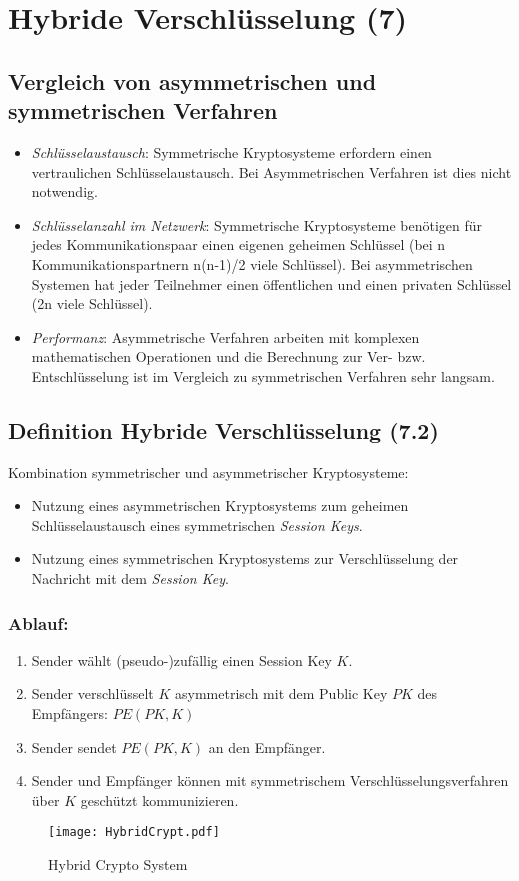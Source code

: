 \chapter{Hybride Verschlüsselung (7)}
\section{Vergleich von asymmetrischen und symmetrischen Verfahren}
\begin{itemize}
  \item \emph{Schlüsselaustausch}: Symmetrische Kryptosysteme erfordern einen vertraulichen Schlüsselaustausch. Bei Asymmetrischen Verfahren ist dies nicht notwendig.
  \item \emph{Schlüsselanzahl im Netzwerk}: Symmetrische Kryptosysteme benötigen für jedes Kommunikationspaar einen eigenen geheimen Schlüssel (bei n Kommunikationspartnern n(n-1)/2 viele Schlüssel). Bei asymmetrischen Systemen hat jeder Teilnehmer einen öffentlichen und einen privaten Schlüssel (2n viele Schlüssel).
  \item \emph{Performanz}: Asymmetrische Verfahren arbeiten mit komplexen mathematischen Operationen und die Berechnung zur Ver- bzw. Entschlüsselung ist im Vergleich zu symmetrischen Verfahren sehr langsam.
\end{itemize}

\section{Definition Hybride Verschlüsselung (7.2)}
Kombination symmetrischer und asymmetrischer Kryptosysteme:
\begin{itemize}
  \item Nutzung eines asymmetrischen Kryptosystems zum geheimen Schlüsselaustausch eines symmetrischen \emph{Session Keys}.
  \item Nutzung eines symmetrischen Kryptosystems zur Verschlüsselung der Nachricht mit dem \emph{Session Key}.
\end{itemize}
\subsection*{Ablauf:}
\begin{enumerate}
  \item Sender wählt (pseudo-)zufällig einen Session Key $K$.
  \item Sender verschlüsselt $K$ asymmetrisch mit dem Public Key $PK$ des Empfängers: $PE(PK, K)$
  \item Sender sendet $PE(PK, K)$ an den Empfänger.
  \item Sender und Empfänger können mit symmetrischem Verschlüsselungsverfahren über $K$ geschützt kommunizieren. 
\end{enumerate}
\begin{figure}[htp]
	\centering
	\texttt{[image: HybridCrypt.pdf]}
	\caption{Hybrid Crypto System}
\end{figure}

